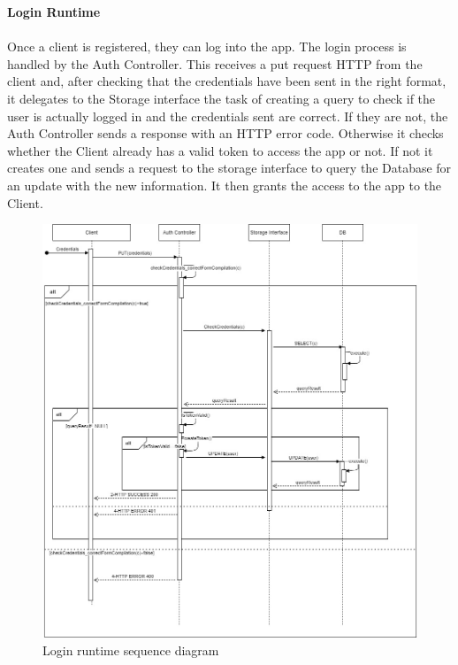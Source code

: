 \documentclass[a4paper, 12pt, oneside, table]{article}
\begin{document}
\textbf{Login Runtime}\\
\\
Once a client is registered, they can log into the app. The login process is handled by the Auth Controller. This receives a put request HTTP from the client and, after checking that the credentials have been sent in the right format, it delegates to the Storage interface the task of creating a query to check if the user is actually logged in and the credentials sent are correct. If they are not, the Auth Controller sends a response with an HTTP error code. Otherwise it checks whether the Client already has a valid token to access the app or not. If not it creates one and sends a request to the storage interface to query the Database for an update with the new information. It then grants the access to the app to the Client.
\begin{figure}[H]
\centering
    \centering
    \includegraphics[height=0.5\textheight, scale=0.5, keepaspectratio]{img/seq_diag/Login_Runtime.jpg}
    \caption{Login runtime sequence diagram}
    \label{logRunTime}
\end{figure}
\end{document}
